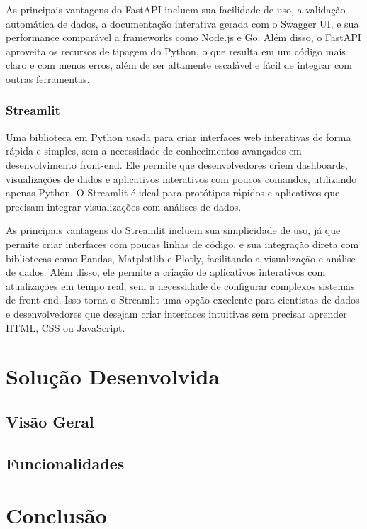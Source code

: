 \documentclass[a4paper, 12pt]{article}
\begin{document}
    As principais vantagens do FastAPI incluem sua facilidade de uso, a validação automática de dados, a documentação interativa gerada com o Swagger UI, e sua performance comparável a frameworks como Node.js e Go. Além disso, o FastAPI aproveita os recursos de tipagem do Python, o que resulta em um código mais claro e com menos erros, além de ser altamente escalável e fácil de integrar com outras ferramentas.

    \subsubsection{Streamlit}
    Uma biblioteca em Python usada para criar interfaces web interativas de forma rápida e simples, sem a necessidade de conhecimentos avançados em desenvolvimento front-end. Ele permite que desenvolvedores criem dashboards, visualizações de dados e aplicativos interativos com poucos comandos, utilizando apenas Python. O Streamlit é ideal para protótipos rápidos e aplicativos que precisam integrar visualizações com análises de dados.

    As principais vantagens do Streamlit incluem sua simplicidade de uso, já que permite criar interfaces com poucas linhas de código, e sua integração direta com bibliotecas como Pandas, Matplotlib e Plotly, facilitando a visualização e análise de dados. Além disso, ele permite a criação de aplicativos interativos com atualizações em tempo real, sem a necessidade de configurar complexos sistemas de front-end. Isso torna o Streamlit uma opção excelente para cientistas de dados e desenvolvedores que desejam criar interfaces intuitivas sem precisar aprender HTML, CSS ou JavaScript.

    \clearpage

    \section{Solução Desenvolvida}
    \subsection{Visão Geral}
    \lipsum[1-2]
    \subsection{Funcionalidades}
    \lipsum[3-4]

    \clearpage

    \section{Conclusão}
\end{document}
